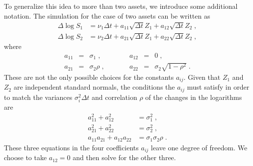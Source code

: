 To generalize this idea to more than two assets, we introduce some additional notation.  The simulation for the case of two assets can be written as
\begin{subequations}\label{mc_twoabcombined}
\begin{align}
\varDelta \log S_1 &= \nu_1\varDelta t + a_{11}\sqrt{\varDelta t}Z_1 + a_{12}\sqrt{\varDelta t}Z_2\;,\label{mc_twoa}\\
\varDelta \log S_2 &= \nu_2\varDelta t + a_{21}\sqrt{\varDelta t}Z_1 + a_{22}\sqrt{\varDelta t}Z_2\;,\label{mc_twob}
\end{align}
\end{subequations}
where
$$\begin{array}{rclcrcl}
a_{11}&=&\sigma_1\;, &\qquad & a_{12}&=&0\; ,\\
a_{21}&=&\sigma_2\rho\;, &\qquad & a_{22} &= &\sigma_2\sqrt{1-\rho^2}\;.
\end{array}$$
These are not the only possible choices for the constants $a_{ij}$.  Given that $Z_1$ and $Z_2$ are independent standard normals, the conditions the $a_{ij}$ must satisfy in order to match the variances $\sigma_i^2\varDelta t$ and correlation $\rho$ of the changes in the logarithms are
\begin{subequations}\label{a13combined}
\begin{align}
a_{11}^2+a_{12}^2 &=\sigma_1^2\;,\label{a1}\\
a_{21}^2+a_{22}^2 &=\sigma_2^2\;,\label{a2}\\
a_{11}a_{21}+a_{12}a_{22} &= \sigma_1\sigma_2\rho\;.\label{a3}
\end{align}
\end{subequations}
These three equations in the four coefficients $a_{ij}$ leave one degree of freedom.  We choose to take $a_{12}=0$ and then solve for the other three.

